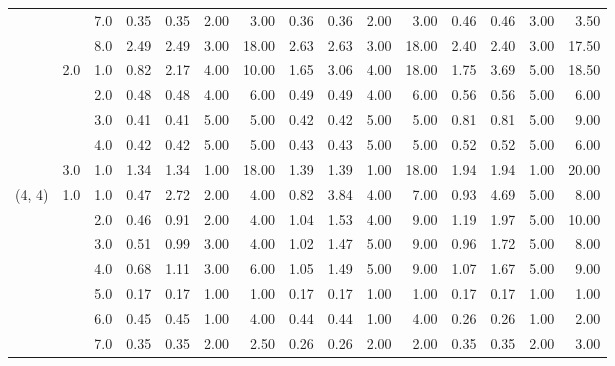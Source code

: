 \begin{tabular}{lllrrrrrrrrrrrr}
       &     & 7.0  &       0.35 &      0.35 & 2.00 &   3.00 &       0.36 &      0.36 &  2.00 &   3.00 &       0.46 &      0.46 &  3.00 &   3.50 \\
       &     & 8.0  &       2.49 &      2.49 & 3.00 &  18.00 &       2.63 &      2.63 &  3.00 &  18.00 &       2.40 &      2.40 &  3.00 &  17.50 \\
       & 2.0 & 1.0  &       0.82 &      2.17 & 4.00 &  10.00 &       1.65 &      3.06 &  4.00 &  18.00 &       1.75 &      3.69 &  5.00 &  18.50 \\
       &     & 2.0  &       0.48 &      0.48 & 4.00 &   6.00 &       0.49 &      0.49 &  4.00 &   6.00 &       0.56 &      0.56 &  5.00 &   6.00 \\
       &     & 3.0  &       0.41 &      0.41 & 5.00 &   5.00 &       0.42 &      0.42 &  5.00 &   5.00 &       0.81 &      0.81 &  5.00 &   9.00 \\
       &     & 4.0  &       0.42 &      0.42 & 5.00 &   5.00 &       0.43 &      0.43 &  5.00 &   5.00 &       0.52 &      0.52 &  5.00 &   6.00 \\
       & 3.0 & 1.0  &       1.34 &      1.34 & 1.00 &  18.00 &       1.39 &      1.39 &  1.00 &  18.00 &       1.94 &      1.94 &  1.00 &  20.00 \\
(4, 4) & 1.0 & 1.0  &       0.47 &      2.72 & 2.00 &   4.00 &       0.82 &      3.84 &  4.00 &   7.00 &       0.93 &      4.69 &  5.00 &   8.00 \\
       &     & 2.0  &       0.46 &      0.91 & 2.00 &   4.00 &       1.04 &      1.53 &  4.00 &   9.00 &       1.19 &      1.97 &  5.00 &  10.00 \\
       &     & 3.0  &       0.51 &      0.99 & 3.00 &   4.00 &       1.02 &      1.47 &  5.00 &   9.00 &       0.96 &      1.72 &  5.00 &   8.00 \\
       &     & 4.0  &       0.68 &      1.11 & 3.00 &   6.00 &       1.05 &      1.49 &  5.00 &   9.00 &       1.07 &      1.67 &  5.00 &   9.00 \\
       &     & 5.0  &       0.17 &      0.17 & 1.00 &   1.00 &       0.17 &      0.17 &  1.00 &   1.00 &       0.17 &      0.17 &  1.00 &   1.00 \\
       &     & 6.0  &       0.45 &      0.45 & 1.00 &   4.00 &       0.44 &      0.44 &  1.00 &   4.00 &       0.26 &      0.26 &  1.00 &   2.00 \\
       &     & 7.0  &       0.35 &      0.35 & 2.00 &   2.50 &       0.26 &      0.26 &  2.00 &   2.00 &       0.35 &      0.35 &  2.00 &   3.00 \\

\end{tabular}
